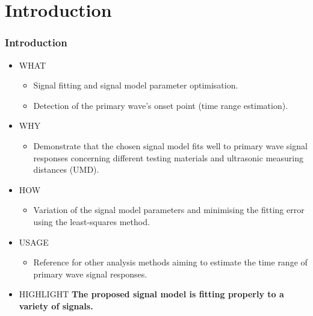 	\section{Introduction}
	\begin{frame}
		\frametitle{Introduction}
		\begin{itemize}
			\item \textcolor{RIPtitlecol}{WHAT}
			\begin{itemize}
				\item Signal fitting and signal model parameter optimisation.
				\item Detection of the primary wave's onset point (time range estimation).
			\end{itemize}
			\item \textcolor{RIPtitlecol}{WHY}
			\begin{itemize}
				\item Demonstrate that the chosen signal model fits well to primary wave signal responses concerning different testing materials and ultrasonic measuring distances (UMD).
			\end{itemize}
			\item \textcolor{RIPtitlecol}{HOW}
			\begin{itemize}
				\item Variation of the signal model parameters and minimising the fitting error using the least-squares method.
			\end{itemize}
			\item \textcolor{RIPtitlecol}{USAGE}
				\begin{itemize}
					\item Reference for other analysis methods aiming to estimate the time range of primary wave signal responses.
				\end{itemize}
			\item \textcolor{RIPtitlecol}{HIGHLIGHT} \textbf{The proposed signal model is fitting properly to a variety of signals.}
		\end{itemize}
	\end{frame}

